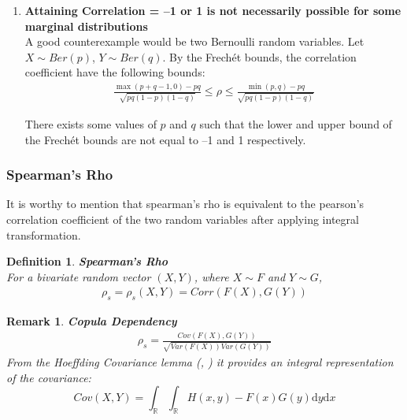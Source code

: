 \documentclass[12pt]{report}
\newtheorem{remark}{Remark}[section]
\newtheorem{definition}{Definition}[subsection]
\newcommand{\1}{\mathbf{1}}
\begin{document}
\begin{flushleft}
\begin{enumerate}
\item \textbf{Attaining Correlation = --1 or 1 is not necessarily possible for some marginal distributions} \\
\vspace{0.5cm}
A good counterexample would be two Bernoulli random variables. Let $X \sim Ber(p)$, $Y \sim Ber(q)$. By the Frech{\'e}t bounds, the correlation coefficient have the following bounds: \\
\vspace{-0.8cm}
\begin{align*}
\frac{\max(p+q-1,0) - pq}{\sqrt{pq(1-p)(1-q)}} \le \rho \le \frac{\min(p,q) - pq}{\sqrt{pq(1-p)(1-q)}}
\end{align*}

There exists some values of $p$ and $q$ such that the lower and upper bound of the Frech{\'e}t bounds are not equal to --1 and 1 respectively.\\ 
\end{enumerate}

\newpage
\subsubsection{Spearman's Rho}
\vspace{0.5cm}

It is worthy to mention that spearman's rho is equivalent to the pearson's correlation coefficient of the two random variables after applying integral transformation.

\begin{definition}\label{SpearmanRhoDefinition}
\textit{\normalfont\parencite{SpearmanRhoAuthor1904}}\:\textbf{Spearman's Rho}  \\
For a bivariate random vector $(X,Y)$, where $X \sim F$ and $Y \sim G$,
\begin{align*}
\rho_{s} = \rho_{s}(X,Y) = Corr(F(X),G(Y))
\end{align*}
\end{definition}

\begin{remark}\label{SpearmanRhoCopulaDependency}\: \textbf{Copula Dependency}\\

\begin{align*}
\rho_{s} = \frac{Cov(F(X),G(Y))}{\sqrt{Var(F(X))Var(G(Y))}}  
\end{align*}
From the Hoeffding Covariance lemma (\cite{höffding1940maßstabinvariante}, \cite{QRMMcNeil}) it provides an integral representation of the covariance: 
\begin{equation*}
Cov(X,Y) = \int_{\mathbb{R}} \int_{\mathbb{R}} H(x,y) - F(x)G(y) \mathrm{d}y\mathrm{d}x 
\end{equation*}


\end{remark}
\end{flushleft}
\end{document}
